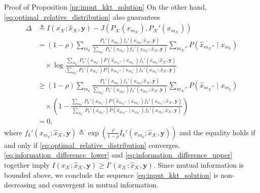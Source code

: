 \documentclass[journal]{IEEEtran}
\begin{document}
\begin{appendix}
\begin{subsection}{Proof of Proposition \ref{pr:input_kkt_solution}}
		On the other hand, \eqref{eq:optimal_relative_distribution} also guarantees
		\begin{subequations}
			\label{eq:information_difference_upper}
			\begin{align}
				\Delta
				 & \triangleq I(x_{\mathcal{K}};\hat{x}_{\mathcal{K}},\boldsymbol{y}) - J \left( P_{\mathcal{K}}(x_{m_{\mathcal{K}}}),P_{\mathcal{K}}'(x_{m_{\mathcal{K}}}) \right)                                                                                                                               \\
				 & = (1 - \rho) \sum_{m_k} \frac{P_k'(x_{m_k}) f_k'(x_{m_k};\hat{x}_{\mathcal{K}},\boldsymbol{y})}{\sum_{m_k'} P_k'(x_{m_k'}) f_k'(x_{m_k'};\hat{x}_{\mathcal{K}},\boldsymbol{y})} \sum_{m_{\mathcal{K}}''} P(\hat{x}_{m_{\mathcal{K}}''} \mid x_{m_k})\nonumber                                  \\
				 & \quad \times \log \frac{\sum_{m_k'} P_k'(x_{m_k'}) P(\hat{x}_{m_{\mathcal{K}}''} \mid x_{m_k'}) f_k'(x_{m_k};\hat{x}_{\mathcal{K}},\boldsymbol{y})}{\sum_{m_k'} P_k'(x_{m_k'}) P(\hat{x}_{m_{\mathcal{K}}''} \mid x_{m_k'}) f_k'(x_{m_k'};\hat{x}_{\mathcal{K}},\boldsymbol{y})}               \\
				 & \ge (1 - \rho) \sum_{m_k} \frac{P_k'(x_{m_k}) f_k'(x_{m_k};\hat{x}_{\mathcal{K}},\boldsymbol{y})}{\sum_{m_k'} P_k'(x_{m_k'}) f_k'(x_{m_k'};\hat{x}_{\mathcal{K}},\boldsymbol{y})} \sum_{m_{\mathcal{K}}''} P(\hat{x}_{m_{\mathcal{K}}''} \mid x_{m_k})\nonumber                                \\
				 & \quad \times \left( 1 - \frac{\sum_{m_k'} P_k'(x_{m_k'}) P(\hat{x}_{m_{\mathcal{K}}''} \mid x_{m_k'}) f_k'(x_{m_k'};\hat{x}_{\mathcal{K}},\boldsymbol{y})}{\sum_{m_k'} P_k'(x_{m_k'}) P(\hat{x}_{m_{\mathcal{K}}''} \mid x_{m_k'}) f_k'(x_{m_k};\hat{x}_{\mathcal{K}},\boldsymbol{y})} \right) \\
				 & = 0,
			\end{align}
		\end{subequations}
		where $f_k'(x_{m_k};\hat{x}_{\mathcal{K}},\boldsymbol{y}) \triangleq \exp \left( \frac{\rho}{1 - \rho} I_k'(x_{m_k};\hat{x}_{\mathcal{K}},\boldsymbol{y}) \right)$ and the equality holds if and only if \eqref{eq:optimal_relative_distribution} converges.
		\eqref{eq:information_difference_lower} and \eqref{eq:information_difference_upper} together imply $I(x_{\mathcal{K}};\hat{x}_{\mathcal{K}},\boldsymbol{y}) \ge I'(x_{\mathcal{K}};\hat{x}_{\mathcal{K}},\boldsymbol{y})$.
		Since mutual information is bounded above, we conclude the sequence \eqref{eq:input_kkt_solution} is non-decreasing and convergent in mutual information.


\end{subsection}
\end{appendix}
\end{document}
